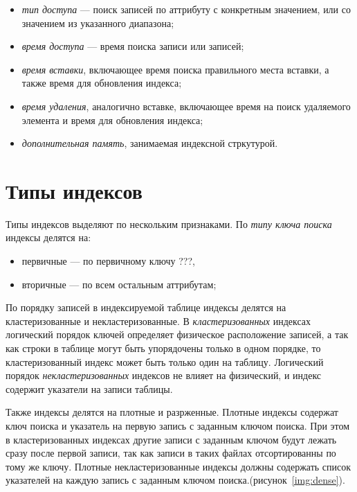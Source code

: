 \begin{itemize}
    \item \textit{тип доступа} --- поиск записей по аттрибуту с конкретным
        значением, или со значением из указанного диапазона;
    \item \textit{время доступа} --- время поиска записи или записей;
    \item \textit{время вставки}, включающее время поиска правильного места вставки, а
        также время для обновления индекса;
    \item \textit{время удаления}, аналогично вставке, включающее время на поиск
        удаляемого элемента и время для обновления индекса;
    \item \textit{дополнительная память}, занимаемая индексной стркутурой.
\end{itemize}

\section{Типы индексов}

Типы индексов выделяют по нескольким признаками. По \textit{типу ключа поиска}
индексы делятся на: 
    \begin{itemize}
        \item первичные --- по первичному ключу ???,
        \item вторичные --- по всем остальным аттрибутам;
    \end{itemize}

По порядку записей в индексируемой таблице индексы делятся на кластеризованные и
некластеризованные.  В \textit{кластеризованных} индексах логический порядок
ключей определяет физическое расположение записей, а так как строки в таблице
могут быть упорядочены только в одном порядке, то кластеризованный индекс может
быть только один на таблицу. Логический порядок \textit{некластеризованных}
индексов не влияет на физический, и индекс содержит указатели на записи
таблицы.

Также индексы делятся на плотные и разрженные. Плотные индексы содержат ключ
поиска и указатель на первую запись с заданным ключом поиска. При этом в
кластеризованных индексах другие записи с заданным ключом будут лежать сразу после
первой записи, так как записи в таких файлах отсортированны по тому же ключу.
Плотные некластеризованные индексы должны содержать список указателей на каждую
запись с заданным ключом поиска.(рисунок~\ref{img:dense}).
 


